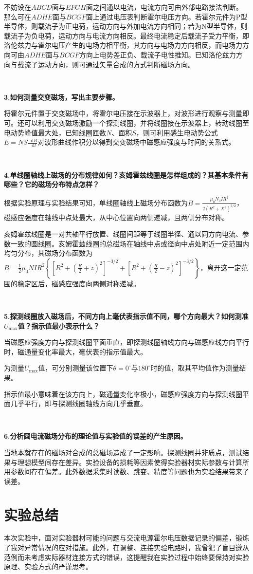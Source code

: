 \documentclass[UTF-8,twoside,cs4size]{ctexart}
\newcommand*{\dif}{\mathop{}\!\mathrm{d}}
\begin{document}
	{\kaishu 不妨设在$ ABCD $面与$ EFGH $面之间通以电流，电流方向可由外部电路接法判断。那么可在$ ADHE $面与$ BCGF $面上通过电压表判断霍尔电压方向。若霍尔元件为P型半导体，则载流子为正电荷，运动方向与外加电流方向相同；若为N型半导体，则载流子为负电荷，运动方向与电流方向相反。最终电流稳定后载流子受力平衡，即洛伦兹力与霍尔电压产生的电场力相平衡，其方向与电场力方向相反，而电场力方向可由$ ADHE $面与$ BCGF $方向上电势差正负、载流子电性推知。已知洛伦兹力方向与载流子运动方向，则可通过矢量合成的方式判断磁场方向。}
	
	~\
	
	\textbf{3.如何测量交变磁场，写出主要步骤。}
	
	{\kaishu 将霍尔元件置于交变磁场中，将霍尔电压接在示波器上，对波形进行观察与测量即可。还可以利用交变磁场激励一个探测线圈，并将线圈接在示波器上，转动线圈至电动势峰值最大处，已知线圈匝数$ N $、面积$ S $，则可利用感生电动势公式$ E=NS\frac{\dif B}{\dif t} $对波形曲线作积分以得到交变磁场中磁感应强度与时间的关系式。}
	
	~\
	
	\textbf{4.单线圈轴线上磁场的分布规律如何？亥姆霍兹线圈是怎样组成的？其基本条件有哪些？它的磁场分布特点怎样？}
	
	{\kaishu 根据实验原理与实验结果可知，单线圈轴线上磁场分布函数为$ B=\frac{\mu_0N_0IR^2}{2(R^2+X^2)^{3/2}} $，磁感应强度在轴线中点处最大，从中心位置向两侧递减，且两侧分布对称。
	
	亥姆霍兹线圈是一对共轴平行放置、线圈间距等于线圈半径、通以同方向电流、参数一致的圆线圈。亥姆霍兹线圈的总磁场在轴线中点或径向中点处附近一定范围内均匀分布，其磁场分布函数为$ B=\frac12\mu_0NIR^2\left\{\left[R^2+\left(\frac R2+z\right)^2\right]^{-3/2}+\left[R^2+\left(\frac R2-z\right)^2\right]^{-3/2}\right\} $，离开这一定范围的稳定区后，磁感应强度向两侧对称递减。}
	
	~\
	
	\textbf{5.探测线圈放入磁场后，不同方向上毫伏表指示值不同，哪个方向最大？如何测准$ U_\max $值？指示值最小表示什么？}
	
	{\kaishu 当磁感应强度方向与探测线圈平面垂直，即探测线圈轴线方向与磁感应线方向平行时，磁通量变化率最大，毫伏表的指示值最大。
	
	为测量$ U_\max $值，可分别测量该位置下$ \theta=0^\circ $与$ 180^\circ $时的值，取其平均值作为测量结果。

	指示值最小意味着在该方向上，磁通量变化率极小，磁感应强度方向与探测线圈平面几乎平行，即与探测线圈轴线方向几乎垂直。}
	
	~\
	
	\textbf{6.分析圆电流磁场分布的理论值与实验值的误差的产生原因。}
	
	{\kaishu 当地本就存在的磁场对合成的总磁场造成了一定影响。探测线圈并非质点，测试结果与理想模型间存在差异。实验设备的损耗等因素使得实验器材实际参数与计算所用参数间存在偏差。此外数据采集时读数、跳变、精度等问题也为实验结果带来了误差。}
	
	\section{实验总结}
	本次实验中，面对实验器材可能的问题与交流电源霍尔电压数据记录的偏差，锻炼了我对异常情况的应对措施。此外，在调整、连接实验电路时，我曾犯了盲目遵从范例而未考虑实际器材连接方式的错误，这提醒我在实验过程中始终要保持对实验原理、实验方式的严谨思考。
\end{document}
